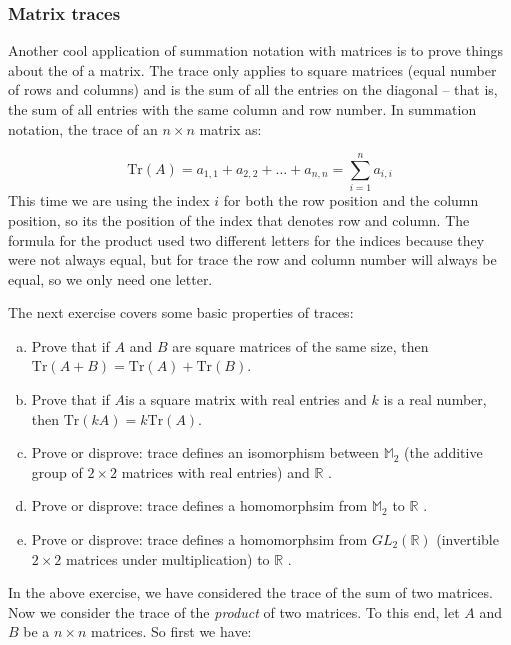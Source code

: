 \subsubsection*{Matrix traces}
Another cool application of summation notation with matrices is to prove things about the  of a matrix.  The trace only applies to square matrices (equal number of rows and columns) and is the sum of all the entries on the diagonal -- that is,  the sum of all entries with the same column and row number.  In summation notation, the trace of an $n \times n$ matrix as:

\[ \text{Tr} \left( A \right)= a_{1,1} + a_{2,2} + \ldots + a_{n,n} = \sum_{i=1}^n a_{i,i} \] 
This time we are using the index $i$ for both the row position and the column position, so its the position of the index that denotes row and column.  The formula for the product used two different letters for the indices because they were not always equal, but for trace the row and column number will always be equal, so we only need one letter.

The next exercise covers some basic properties of traces:

\begin{exercise}{}
\begin{enumerate}[(a)]
\item
Prove that if $A$ and $B$ are square matrices of the same size, then $\text{Tr} \left( A + B \right) = \text{Tr} \left( A \right) + \text{Tr} \left( B \right)$.
\item
Prove that if $A $is a square matrix with real entries and $k$ is a real number, then $\text{Tr} \left(k A  \right) = k\text{Tr} \left( A \right)$.
\item
Prove or disprove: trace defines an isomorphism between $\mathbb{M}_2$ (the additive group of $2 \times 2$ matrices with real entries) and $\mathbb{R}$ .
\item
Prove or disprove: trace defines a homomorphsim from $\mathbb{M}_2$ to $\mathbb{R}$ .
\item
Prove or disprove: trace defines a homomorphsim from $GL_2(\mathbb{R})$ (invertible $2 \times 2$ matrices under multiplication)  to $\mathbb{R}$ .
\end{enumerate}
\end{exercise}


In the above exercise, we have considered the trace of the sum of two matrices. Now we consider the trace of the \emph{product} of two matrices.  To this end, let ${A}$ and  ${B}$ be a $n \times n$ matrices.  So first we have:

